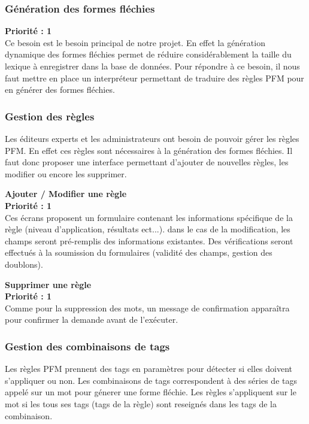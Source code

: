 \documentclass[12pt,a4paper]{article}
\begin{document}
    \subsubsection{Génération des formes fléchies}
    \textbf{Priorité : 1} \\
    Ce besoin est le besoin principal de notre projet. En effet la génération dynamique des formes fléchies permet de réduire considérablement la taille du lexique à enregistrer dans la base de données.
    Pour répondre à ce besoin, il nous faut mettre en place un interpréteur permettant de traduire des règles PFM pour en générer des formes fléchies.

    \subsubsection{Gestion des règles}

    Les éditeurs experts et les administrateurs ont besoin de pouvoir gérer les règles PFM. En effet ces règles sont nécessaires à la génération des formes fléchies. Il faut donc proposer une interface permettant d'ajouter de nouvelles règles, les modifier ou encore les supprimer.

    \textbf{Ajouter / Modifier une règle}  \\
    \textbf{Priorité : 1} \\
    Ces écrans proposent un formulaire contenant les informations spécifique de la règle (niveau d'application, résultats ect...). dans le cas de la modification, les champs seront pré-remplis des informations existantes.
    Des vérifications seront effectués à la soumission du formulaires (validité des champs, gestion des doublons).

    \textbf{Supprimer une règle}  \\
    \textbf{Priorité : 1} \\
    Comme pour la suppression des mots, un message de confirmation apparaîtra pour confirmer la demande avant de l'exécuter.

    \subsubsection{Gestion des combinaisons de tags}

    Les règles PFM prennent des tags en paramètres pour détecter si elles doivent s'appliquer ou non.
    Les combinaisons de tags correspondent à des séries de tags appelé sur un mot pour génerer une forme fléchie.
    Les règles s'appliquent sur le mot si les tous ses tags (tags de la règle) sont reseignés dans les tags de la combinaison.
\end{document}
